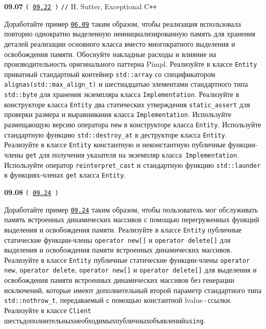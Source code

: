 \documentclass[a4paper,12pt]{article}
\begin{document}
\bigskip

{\large \textbf{09.07} \texttt{(\,\href{https://github.com/i-s-m-mipt/Education/blob/master/projects/examples/source/09.22.cpp}{09.22}\,)} \texttt{//} H. Sutter, Exceptional C\texttt{++}}

\bigskip

Доработайте пример \href{https://github.com/i-s-m-mipt/Education/blob/master/projects/examples/source/06.09.hpp}{\texttt{06.09}} таким образом, чтобы реализация использовала повторно  однократно выделенную неинициализированную память для хранения деталей реализации основного класса вместо многократного выделения и освобождения памяти. Обоснуйте накладные расходы и влияние на производительность оригинального паттерна Pimpl. Реализуйте в классе \lstinline{Entity} приватный стандартный контейнер \lstinline{std::array} со спецификатором \lstinline{alignas(std::max_align_t)} и шестнадцатью элементами стандартного типа \lstinline{std::byte} для хранения экземпляра класса \lstinline{Implementation}. Реализуйте в конструкторе класса \lstinline{Entity} два статических утверждения \lstinline{static_assert} для проверки размера и выравнивания класса \lstinline{Implementation}. Используйте размещающую версию оператора \lstinline{new} в конструкторе класса \lstinline{Entity}. Используйте стандартную функцию \lstinline{std::destroy_at} в деструкторе класса \lstinline{Entity}. Реализуйте в классе \lstinline{Entity} константную и неконстантную публичные функции-члены \lstinline{get} для получения указателя на экземпляр класса~\lstinline{Implementation}. Используйте оператор \lstinline{reinterpret_cast} и стандартную функцию \lstinline{std::launder} в функциях-членах \lstinline{get} класса \lstinline{Entity}.

\bigskip

{\large \textbf{09.08} \texttt{(\,\href{https://github.com/i-s-m-mipt/Education/blob/master/projects/examples/source/09.24.cpp}{09.24}\,)}}

\bigskip

Доработайте пример \href{https://github.com/i-s-m-mipt/Education/blob/master/projects/examples/source/09.24.cpp}{\texttt{09.24}} таким образом, чтобы пользователь мог обслуживать память встроенных динамических массивов с помощью перегруженных функций выделения и освобождения памяти. Реализуйте в классе \lstinline{Entity} публичные статические функции-члены \lstinline{operator new[]} и \lstinline{operator delete[]} для выделения и освобождения памяти встроенных динамических массивов. Реализуйте в классе \lstinline{Entity} публичные статические функции-члены \lstinline{operator new}, \lstinline{operator delete}, \lstinline{operator new[]} и \lstinline{operator delete[]} для выделения и освобождения памяти встроенных динамических массивов без генерации исключений, которые имеют дополнительный второй параметр стандартного типа \lstinline{std::nothrow_t}, передаваемый с помощью константной lvalue\,-\,ссылки. Реализуйте в классе \lstinline{Client} шесть\:дополнительных\:необходимых\:публичных\:объявлений\:\lstinline{using}.
\end{document}
